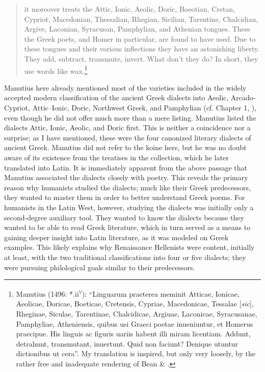 \documentclass[output=paper]{langsci/langscibook}
\begin{document}
\begin{quote}
it moreover treats the Attic, Ionic, Aeolic, Doric, Boeotian, Cretan, Cypriot, Macedonian, Thessalian, Rhegian, Sicilian, Tarentine, Chalcidian, Argive, Laconian, Syracusan, Pamphylian, and Athenian tongues. These the Greek poets, and Homer in particular, are found to have used. Due to these tongues and their various inflections they have an astonishing liberty. They add, subtract, transmute, invert. What don’t they do? In short, they use words like wax.\footnote{Manutius (1496: *.ii\textsc{\textsuperscript{v}}): “Linguarum praeterea meminit Atticae, Ionicae, Aeolicae, Doricae, Boeticae, Cretensis, Cypriae, Macedonicae, Tessalae [\textit{sic}], Rheginae, Siculae, Tarentinae, Chalcidicae, Argiuae, Laconicae, Syracusanae, Pamphyliae, Atheniensis, quibus usi Graeci poetae inueniuntur, et Homerus praecipue. His linguis ac figuris uariis habent illi miram licentiam. Addunt, detrahunt, transmutant, inuertunt. Quid non faciunt? Denique utuntur dictionibus ut cera”. My translation is inspired, but only very loosely, by the rather free and inadequate rendering of Bean \& \citet[12]{Lemke1958}.}
\end{quote}

Manutius here already mentioned most of the varieties included in the widely accepted modern classification of the ancient Greek dialects into Aeolic, Arcado-Cypriot, Attic–Ionic, Doric, Northwest Greek, and Pamphylian (cf. Chapter 1, ), even though he did not offer much more than a mere listing. Manutius listed the dialects Attic, Ionic, Aeolic, and Doric first. This is neither a coincidence nor a surprise; as I have mentioned, these were the four canonized literary dialects of ancient Greek. Manutius did not refer to the koine here, but he was no doubt aware of its existence from the treatises in the collection, which he later translated into Latin. It is immediately apparent from the above passage that Manutius associated the dialects closely with poetry. This reveals the primary reason why humanists studied the dialects; much like their Greek predecessors, they wanted to master them in order to better understand Greek poems. For humanists in the Latin West, however, studying the dialects was initially only a second-degree auxiliary tool. They wanted to know the dialects because they wanted to be able to read Greek literature, which in turn served as a means to gaining deeper insight into Latin literature, as it was modeled on Greek examples. This likely explains why Renaissance Hellenists were content, initially at least, with the two traditional classifications into four or five dialects; they were pursuing philological goals similar to their predecessors.
\end{document}
